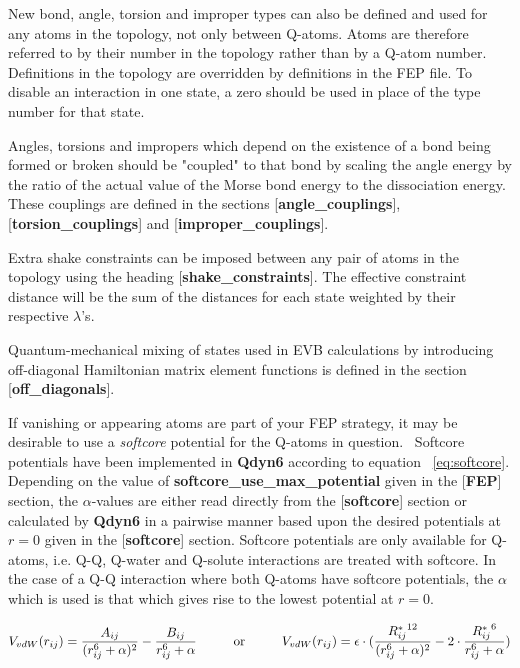 \documentclass[a4paper,11pt]{article}
\let\origcite\cite
\def\cite#1{\unskip~\origcite{#1}}
\let\origref\ref
\def\ref#1{\unskip~\origref{#1}}
\begin{document}
New bond,  angle, torsion and improper  types can also be  defined and
used for any  atoms in the topology, not only  between Q-atoms.  Atoms
are therefore referred to by their  number in the topology rather than
by  a Q-atom  number. Definitions  in the  topology are  overridden by
definitions in the FEP file. To disable an interaction in one state, a
zero should be used in place of the type number for that state.

Angles, torsions and impropers which depend on the existence of a bond
being formed or broken should be "coupled" to that bond by scaling the
angle energy by the ratio of the actual value of the Morse bond energy
to  the  dissociation  energy.  These couplings  are  defined  in  the
sections   [\textbf{angle\_couplings}],  [\textbf{torsion\_couplings}]
and [\textbf{improper\_couplings}].

Extra shake  constraints can be imposed  between any pair of  atoms in
the  topology using  the  heading [\textbf{shake\_constraints}].   The
effective constraint  distance will  be the sum  of the  distances for
each state weighted by their respective $\lambda$'s.

Quantum-mechanical  mixing  of  states  used in  EVB  calculations  by
introducing  off-diagonal  Hamiltonian  matrix  element  functions  is
defined in the section [\textbf{off\_diagonals}].

If vanishing or appearing atoms are  part of your FEP strategy, it may
be desirable to  use a \textit{softcore} potential for  the Q-atoms in
question.\cite{Zacharias1994}    Softcore   potentials    have   been
implemented in \textbf{Qdyn6}  according to equation \ref{eq:softcore}.
Depending on the value of \textbf{softcore\-\_use\-\_max\-\_potential}
given in  the [\textbf{FEP}]  section, the $\alpha$-values  are either
read directly  from the  [\textbf{softcore}] section or  calculated by
\textbf{Qdyn6} in a  pairwise manner based upon  the desired potentials
at $r=0$ given in the [\textbf{softcore}] section. Softcore potentials
are  only  available  for  Q-atoms, i.e.  Q-Q,  Q-water  and  Q-solute
interactions  are  treated  with  softcore.  In  the  case  of  a  Q-Q
interaction where both Q-atoms  have softcore potentials, the $\alpha$
which is  used is  that which  gives rise to  the lowest  potential at
$r=0$.

\begin {equation}
\label{eq:softcore}
 V_{vdW}(r_{ij}) = \frac{A_{ij}}{(r_{ij}^6 + \alpha)^2} - \frac{B_{ij}}{r_{ij}^6 +
 \alpha}
 \text{\hspace{1cm}or\hspace{1cm}}
 V_{vdW}(r_{ij}) = \epsilon\cdot(\frac{{R_{ij}^{*}}^{12}}{(r_{ij}^6 + \alpha)^2} - 2\cdot\frac{{R_{ij}^{*}}^{6}}{r_{ij}^6 + \alpha})
\end{equation}
\end{document}
